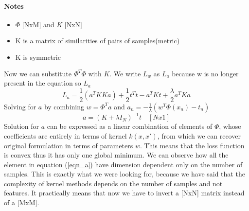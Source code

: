 \documentclass[../main.tex]{subfiles}
\begin{document}
\paragraph{Notes}
\begin{itemize}
    \item $\Phi$ [NxM] and $K$ [NxN]
    \item K is a matrix of similarities of pairs of samples(metric)
    \item K is symmetric
\end{itemize}
Now we can substitute $\Phi^T \Phi$ with $K$. We write $L_w$ as $L_a$ because w is no longer present in the equation so $L_a$
\begin{equation*}
    L_a = \frac{1}{2}(a^T K K a) + \frac{1}{2}t^T t - a^T K t +\frac{\lambda}{2} a^T K a
\end{equation*}
Solving for $a$ by combining $w=\Phi^T a$ and $a_n=-\frac{1}{\lambda}(w^T \Phi(x_n)-t_n)$
\begin{equation}
    a = (K + \lambda I_N)^{-1} t \quad [Nx1]
\end{equation} \label{eqn_a}
Solution for $a$ can be expressed as a linear combination of elements of $\Phi$, whose coefficients are entirely in terms of kernel $k(x,x')$, from
which we can recover original formulation in terms of parameters $w$. This means that the loss function is convex thus it has only one global minimum. We can observe how all the element in equation (\ref{eqn_a}) have dimension dependent only on the number of samples. This is exactly what we were looking for, because we have said that the complexity of kernel methods depends on the number of samples and not features. It practically means that now we have to invert a [NxN] matrix instead of a [MxM].
\end{document}
